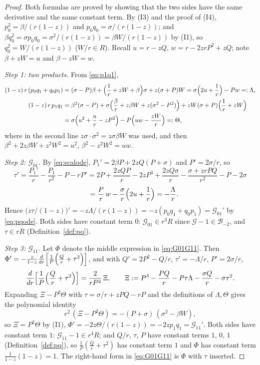 \documentclass[11pt]{article}
\theoremstyle{definition}
\theoremstyle{remark}
\begin{document}
\begin{proof}
Both formulas are proved by showing that the two sides have the same derivative and the same constant term. By (I3) and the proof of (I4), $p_0^2=\beta/(r(1-z))$ and $p_0q_0=\sigma/(r(1-z))$; and $\beta q_0^2=\sigma p_0q_0=\sigma^2/(r(1-z))=\beta W/(r(1-z))$ by (I1), so $q_0^2=W/(r(1-z))$ ($W/r\in R$). Recall $u=r-zQ$, $w=r-2zrP^2+zQ$; note $\beta+zW=u$ and $\beta-zW=w$.

\emph{Step 1: two products.} From \eqref{eq:p1q1},
\begin{align*}
(1-z)\,r\,(p_0q_1+q_0p_1)&=(\sigma-P)\beta+\Bigl(\frac1r+zW+\beta\Bigr)\sigma+z(\sigma+P)W
=\sigma\Bigl(2u+\frac1r\Bigr)-Pw=:\Lambda,\\
(1-z)\,r\,p_1q_1&=\beta^2(\sigma-P)+\sigma\Bigl(\frac\beta r+z\beta W+z(\sigma^2-P^2)\Bigr)+zW(\sigma+P)\Bigl(\frac1r+zW\Bigr)\\
&=\sigma\Bigl(u^2+\frac ur-zP^2\Bigr)-P\Bigl(uw-\frac{zW}r\Bigr)=:\Theta,
\end{align*}
where in the second line $z\sigma\cdot\sigma^2=z\sigma\beta W$ was used, and then $\beta^2+2z\beta W+z^2W^2=u^2$, $\beta^2-z^2W^2=uw$.

\emph{Step 2: $\mathcal G_{01}$.} By \eqref{eq:scalode}, $P_1'=2\beta P+2zQ(P+\sigma)$ and $P'=2\sigma/r$, so
\[
\tau'=\frac{P_1'}r-\frac{P_1}{r^2}-P-rP'
=2P+\frac{2zQP}r-2zP^3+\frac{2zQ\sigma}r-\frac{\sigma+zrPQ}{r^2}-P-2\sigma
\]
\[
\phantom{\tau'}=\frac Pr\,w-\frac\sigma r\Bigl(2u+\frac1r\Bigr)=-\frac\Lambda r .
\]
Hence $\bigl(z\tau/(1-z)\bigr)'=-z\Lambda/(r(1-z))=-z(p_0q_1+q_0p_1)=\mathcal G_{01}'$ by \eqref{eq:pqode}. Both sides have constant term $0$: $\mathcal G_{01}\in r^3R$ since $\mathcal G-1\in\mathcal B_{-2}$, and $\tau\in rR$ (Definition~\ref{def:pq}).

\emph{Step 3: $\mathcal G_{11}$.} Let $\Phi$ denote the middle expression in \eqref{eq:G01G11}. Then $\Phi'=-\frac z{1-z}\frac{d}{dr}\Bigl[\frac1P\Bigl(\frac Qr+\tau^2\Bigr)\Bigr]$, and with $Q'=2P^2-Q/r$, $\tau'=-\Lambda/r$, $P'=2\sigma/r$,
\[
\frac{d}{dr}\Bigl[\frac1P\Bigl(\frac Qr+\tau^2\Bigr)\Bigr]=\frac{2}{rP^2}\,\Xi,\qquad
\Xi:=P^3-\frac{PQ}r-P\tau\Lambda-\frac{\sigma Q}r-\sigma\tau^2 .
\]
Expanding $\Xi-P^2\Theta$ with $\tau=\sigma/r+zPQ-rP$ and the definitions of $\Lambda,\Theta$ gives the polynomial identity
\[
r^2\,(\Xi-P^2\Theta)=-(P+\sigma)\,(\sigma^2-\beta W),
\]
so $\Xi=P^2\Theta$ by (I1), $\Phi'=-2z\Theta/(r(1-z))=-2zp_1q_1=\mathcal G_{11}'$. Both sides have constant term $1$: $\mathcal G_{11}-1\in r^4R$; and $Q/r$, $\tau$, $P$ have constant terms $1$, $0$, $1$ (Definition~\ref{def:pq}), so $\frac1P(\frac Qr+\tau^2)$ has constant term $1$ and $\Phi$ has constant term $\frac1{1-z}(1-z)=1$. The right-hand form in \eqref{eq:G01G11} is $\Phi$ with $\tau$ inserted.
\end{proof}
\end{document}
